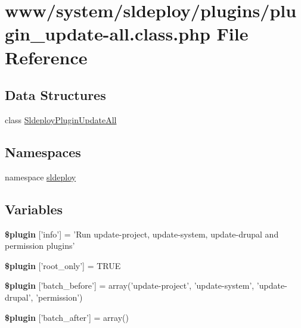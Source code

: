 \hypertarget{plugin__update-all_8class_8php}{
\section{www/system/sldeploy/plugins/plugin\_\-update-\/all.class.php File Reference}
\label{plugin__update-all_8class_8php}
}
\subsection*{Data Structures}
\begin{DoxyCompactItemize}
\item 
class \hyperlink{class_sldeploy_plugin_update_all}{SldeployPluginUpdateAll}
\end{DoxyCompactItemize}
\subsection*{Namespaces}
\begin{DoxyCompactItemize}
\item 
namespace \hyperlink{namespacesldeploy}{sldeploy}
\end{DoxyCompactItemize}
\subsection*{Variables}
\begin{DoxyCompactItemize}
\item 
\hypertarget{plugin__update-all_8class_8php_a95edf69ebbeaeedb03bab3bb010f2af9}{
{\bfseries \$plugin} \mbox{[}'info'\mbox{]} = 'Run update-\/project, update-\/system, update-\/drupal and permission plugins'}
\label{plugin__update-all_8class_8php_a95edf69ebbeaeedb03bab3bb010f2af9}

\item 
\hypertarget{plugin__update-all_8class_8php_a1d302084fa15e3efe6c843cbb5096985}{
{\bfseries \$plugin} \mbox{[}'root\_\-only'\mbox{]} = TRUE}
\label{plugin__update-all_8class_8php_a1d302084fa15e3efe6c843cbb5096985}

\item 
\hypertarget{plugin__update-all_8class_8php_a012a3bf659adb682b0d7114b6cd57f7b}{
{\bfseries \$plugin} \mbox{[}'batch\_\-before'\mbox{]} = array('update-\/project', 'update-\/system', 'update-\/drupal', 'permission')}
\label{plugin__update-all_8class_8php_a012a3bf659adb682b0d7114b6cd57f7b}

\item 
\hypertarget{plugin__update-all_8class_8php_a7ab129642ebf64ed891057b5e5bea66c}{
{\bfseries \$plugin} \mbox{[}'batch\_\-after'\mbox{]} = array()}
\label{plugin__update-all_8class_8php_a7ab129642ebf64ed891057b5e5bea66c}

\end{DoxyCompactItemize}


